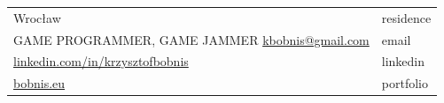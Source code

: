 \documentclass[12pt,a4paper]{article}
\begin{document}
\begin{tabular}  { >{\RaggedLeft} p{16cm}  p{2cm} }  
	{\Large \textbf{KRZYSZTOF BOBNIS}} \hfill Wrocław & \textcolor{techColor}{residence} \\
	 GAME PROGRAMMER, GAME JAMMER \hfill  {\href{mailto:kbobnis@gmail.com}{kbobnis@gmail.com}} & \textcolor{techColor}{email} \\ 
	 \hfill {\href{https://www.linkedin.com/in/krzysztofbobnis}{linkedin.com/in/krzysztofbobnis}} & \textcolor{techColor}{linkedin} \\
	 \hfill {\href{http://bobnis.eu}{bobnis.eu}} & \textcolor{techColor}{portfolio} \\
\end{tabular}	 

\vspace{1cm}
\end{document}

